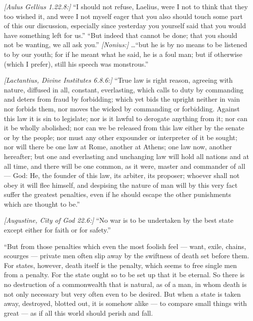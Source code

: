  \textit{[Aulus Gellius 1.22.8:]} ``I should not refuse, Laelius, were I not to think that they too wished it, and were I not myself eager that you also should touch some part of this our discussion, especially since yesterday you yourself said that you would have something left for us.'' ``But indeed that cannot be done; that you should not be wanting, we all ask you.'' \textit{[Nonius:]} \ldots ``but he is by no means to be listened to by our youth; for if he meant what he said, he is a foul man; but if otherwise (which I prefer), still his speech was monstrous.''

 \textit{[Lactantius, Divine Institutes 6.8.6:]} ``True law is right reason, agreeing with nature, diffused in all, constant, everlasting, which calls to duty by commanding and deters from fraud by forbidding; which yet bids the upright neither in vain nor forbids them, nor moves the wicked by commanding or forbidding. Against this law it is sin to legislate; nor is it lawful to derogate anything from it; nor can it be wholly abolished; nor can we be released from this law either by the senate or by the people; nor must any other expounder or interpreter of it be sought; nor will there be one law at Rome, another at Athens; one law now, another hereafter; but one and everlasting and unchanging law will hold all nations and at all time, and there will be one common, as it were, master and commander of all --- God: He, the founder of this law, its arbiter, its proposer; whoever shall not obey it will flee himself, and despising the nature of man will by this very fact suffer the greatest penalties, even if he should escape the other punishments which are thought to be.''

 \textit{[Augustine, City of God 22.6:]} ``No war is to be undertaken by the best state except either for faith or for safety.''

 ``But from those penalties which even the most foolish feel --- want, exile, chains, scourges --- private men often slip away by the swiftness of death set before them. For states, however, death itself is the penalty, which seems to free single men from a penalty. For the state ought so to be set up that it be eternal. So there is no destruction of a commonwealth that is natural, as of a man, in whom death is not only necessary but very often even to be desired. But when a state is taken away, destroyed, blotted out, it is somehow alike --- to compare small things with great --- as if all this world should perish and fall.

